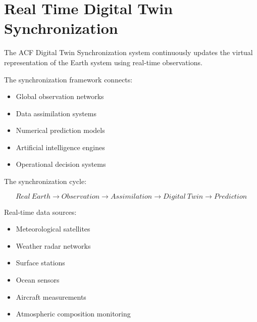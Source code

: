 \section{Real Time Digital Twin Synchronization}



The ACF Digital Twin Synchronization system continuously updates
the virtual representation of the Earth system using real-time
observations.



The synchronization framework connects:


\begin{itemize}

\item Global observation networks

\item Data assimilation systems

\item Numerical prediction models

\item Artificial intelligence engines

\item Operational decision systems

\end{itemize}



The synchronization cycle:


\[
Real\ Earth
\rightarrow
Observation
\rightarrow
Assimilation
\rightarrow
Digital\ Twin
\rightarrow
Prediction
\]



Real-time data sources:


\begin{itemize}

\item Meteorological satellites

\item Weather radar networks

\item Surface stations

\item Ocean sensors

\item Aircraft measurements

\item Atmospheric composition monitoring

\end{itemize}



